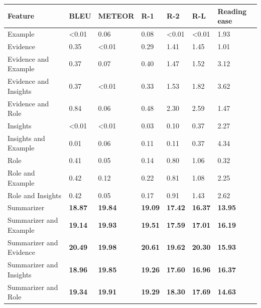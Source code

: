 \begin{tabular}{|l|l|l|l|l|l|l|}
\hline
\textbf{Feature} & BLEU & METEOR & R-1 & R-2 & R-L & Reading ease \\
 \hline
 Example & \textless{}0.01 & 0.06 & 0.08 & \textless{}0.01 & \textless{}0.01 & 1.93 \\
 \hline
 Evidence & 0.35 & \textless{}0.01 & 0.29 & 1.41 & 1.45 & 1.01 \\
 \hline
 Evidence and Example & 0.37 & 0.07 & 0.40 & 1.47 & 1.52 & 3.12 \\
 \hline
 Evidence and Insights & 0.37 & \textless{}0.01 & 0.33 & 1.53 & 1.82 & 3.62 \\
 \hline
 Evidence and Role & 0.84 & 0.06 & 0.48 & 2.30 & 2.59 & 1.47 \\
 \hline
 Insights & \textless{}0.01 & \textless{}0.01 & 0.03 & 0.10 & 0.37 & 2.27 \\
 \hline
 Insights and Example & 0.01 & 0.06 & 0.11 & 0.11 & 0.37 & 4.34 \\
 \hline
 Role & 0.41 & 0.05 & 0.14 & 0.80 & 1.06 & 0.32 \\
 \hline
 Role and Example & 0.42 & 0.12 & 0.22 & 0.81 & 1.08 & 2.25 \\
 \hline
 Role and Insights & 0.42 & 0.05 & 0.17 & 0.91 & 1.43 & 2.62 \\
 \hline
 Summarizer & \textbf{18.87} & \textbf{19.84} & \textbf{19.09} & \textbf{17.42} & \textbf{16.37} & \textbf{13.95} \\
 \hline
 Summarizer and Example & \textbf{19.14} & \textbf{19.93} & \textbf{19.51} & \textbf{17.59} & \textbf{17.01} & \textbf{16.19} \\
 \hline
 Summarizer and Evidence & \textbf{20.49} & \textbf{19.98} & \textbf{20.61} & \textbf{19.62} & \textbf{20.30} & \textbf{15.93} \\
 \hline
 Summarizer and Insights & \textbf{18.96} & \textbf{19.85} & \textbf{19.26} & \textbf{17.60} & \textbf{16.96} & \textbf{16.37} \\
 \hline
 Summarizer and Role & \textbf{19.34} & \textbf{19.91} & \textbf{19.29} & \textbf{18.30} & \textbf{17.69} & \textbf{14.63} \\
\hline
\end{tabular}
